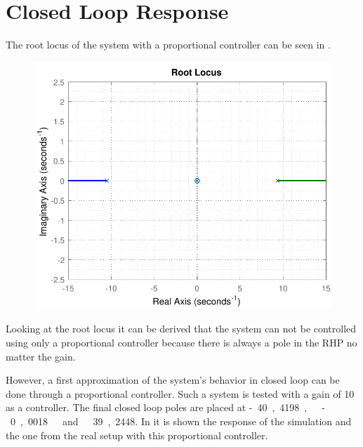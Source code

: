 \section{Closed Loop Response}\label{closedLoop}

The root locus of the system with a proportional controller can be seen in .

\begin{figure}[H]
	\centering 
	\includegraphics[scale=.75]{figures/rlocusCubli}
	\label{rlocusCubli2}
\end{figure}

Looking at the root locus it can be derived that the system can not be controlled using only a proportional controller because there is always a pole in the RHP no matter the gain.

However, a first approximation of the system's behavior in closed loop can be done through a proportional controller. Such a system is tested with a gain of 10 as a controller. The final closed loop poles are placed at \si{-40,4198,\ -0,0018\ and\ 39,2448}. In  it is shown the response of the simulation and the one from the real setup with this proportional controller.

